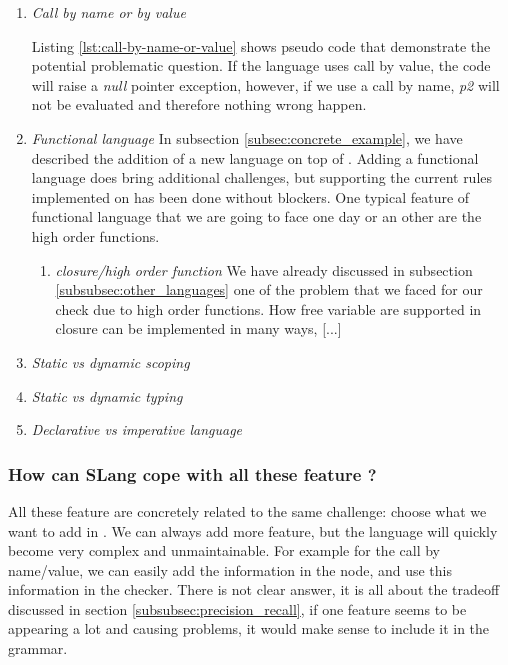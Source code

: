 \begin{enumerate}
	\item \textit{Call by name or by value} \newline
	
	
	Listing \ref{lst:call-by-name-or-value} shows pseudo code that demonstrate the potential problematic question. If the language uses call by value, the code will raise a \emph{null} pointer exception, however, if we use a call by name, \emph{p2} will not be evaluated and therefore nothing wrong happen. \newline
	\item \textit{Functional language} \newline
	In subsection \ref{subsec:concrete_example}, we have described the addition of a new language on top of \slang{}.
	Adding a functional language does bring additional challenges, but supporting the current rules implemented on \slang{} has been done without blockers. \newline
	One typical feature of functional language that we are going to face one day or an other are the high order functions.
	\begin{enumerate}
		\item \textit{closure/high order function} \newline
		We have already discussed in subsection \ref{subsubsec:other_languages} one of the problem that we faced for our check due to high order functions. 
		How free variable are supported in closure can be implemented in many ways, [...]
	\end{enumerate}
	
	\item \textit{Static vs dynamic scoping} \newline
	\item \textit{Static vs dynamic typing} \newline
	\item \textit{Declarative vs imperative language} \newline
\end{enumerate}


\subsubsection{How can SLang cope with all these feature ?}
\label{subsubsec:how_can_slang_cope_with_features}

All these feature are concretely related to the same challenge: choose what we want to add in \slang{}. 
We can always add more feature, but the language will quickly become very complex and unmaintainable. For example for the call by name/value, we can easily add the information in the node, and use this information in the checker. 
There is not clear answer, it is all about the tradeoff discussed in section \ref{subsubsec:precision_recall}, if one feature seems to be appearing a lot and causing problems, it would make sense to include it in the grammar.



